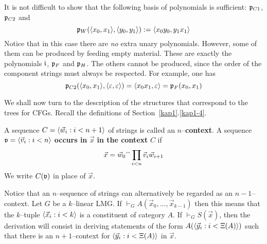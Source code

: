 It is not difficult to show that the following basis of polynomials 
is sufficient: $\mathfrak{p}_{C1}$, $\mathfrak{p}_{C2}$ and 
\begin{equation}
\mathfrak{p}_{W}(\langle x_0, x_1\rangle, \langle y_0, y_1\rangle) := \langle x_0y_0, y_1x_1\rangle
\end{equation}
Notice that in this case there are {\it no\/} extra unary
polynomials. However, some of them can be produced by feeding
empty material. These are exactly the polynomials $\mathfrak{i}$, $\mathfrak{p}_F$ 
and $\mathfrak{p}_H$. The others cannot be produced, since
the order of the component strings must always be respected.
For example, one has
\begin{equation}
\mathfrak{p}_{C2}(\langle x_0,x_1\rangle,\langle \varepsilon, \varepsilon\rangle) = \langle x_0x_1,
    \varepsilon\rangle = \mathfrak{p}_F(x_0, x_1)
\end{equation}

We shall now turn to the description of the structures that 
correspond to the trees for CFGs. Recall the definitions of 
Section~\ref{kap1}.\ref{kap1-4}. 
\begin{defn}
\label{defn:context}
A sequence $C = \langle \vec{w}_i : i < n+1\rangle$ of strings is called
an $n$--\textbf{context}. A sequence $\mathfrak{v} = \langle \vec{v}_i : i < n\rangle$
\textbf{occurs in} $\vec{x}$ \textbf{in the context} $C$ if
\begin{equation}
\vec{x} = \vec{w}_0{^{\smallfrown}}\prod_{i < n} \vec{v}_i\vec{w}_{i+1}
\end{equation}
We write $C(\mathfrak{v})$ in place of $\vec{x}$.
\end{defn}
Notice that an $n$--sequence of strings can alternatively be
regarded as an $n-1$--context. Let $G$ be a $k$--linear
LMG. If $\vdash_G A(\vec{x}_0, \dotsc, \vec{x}_{k-1})$
then this means that the $k$--tuple $\langle \vec{x}_i : i < k\rangle$
is a constituent of category $A$. If $\vdash_G S(\vec{x})$, then 
the derivation will consist in deriving statements of the form 
$A(\langle \vec{y}_i : i < \Xi(A)\rangle)$ such that there is an 
$n+1$--context for $\langle \vec{y}_i : i < \Xi(A)\rangle$ in 
$\vec{x}$.


